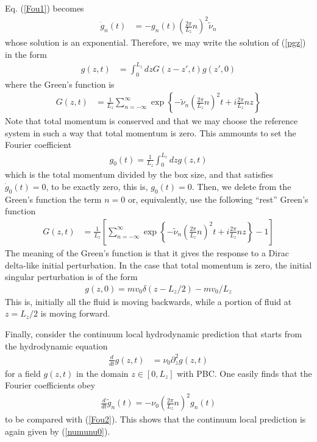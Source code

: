\documentclass[b5paper,openright,11pt]{book}
\begin{document}
\begin{appendices}
Eq. (\ref{Fou1}) becomes
\begin{align}
\dot{g}_n(t)
&=-  {g}_n(t)\left(\frac{2\pi}{L_z}n\right)^2\tilde{\nu}_n
\label{Fou2}
\end{align}
whose solution is an exponential. Therefore, we may write the solution
of (\ref{pgz}) in the form 
\begin{align}
  g(z,t)&=\int_0^{L_z} dz G(z-z',t)g(z',0)  
\end{align}
where the Green's function is 
\begin{align}
  G(z,t)&=\frac{1}{L_z}\sum_{n=-\infty}^\infty \exp\left\{-\tilde{\nu}_n\left(\frac{2\pi}{L_z}n\right)^2t+
i\frac{2\pi}{L_z}nz\right\}
\label{Green1}
\end{align}
Note  that total  momentum is  conserved and  that we  may choose  the
reference system in such a way that total momentum is zero. This ammounts to
set the Fourier coefficient
\begin{align}
  g_0(t)=\frac{1}{L_z}\int_0^{L_z}dz g(z,t)
\end{align}
which  is  the total  momentum  divided  by  the  box size,  and  that
satisfies   $\dot{g}_0(t)=0$,   to   be   exactly   zero,   this   is,
$g_0(t)=0$. Then, we delete from the Green's function the term
$n=0$ or, equivalently, use the following ``rest'' Green's function
\begin{align}
  G(z,t)&=\frac{1}{L_z}\left[\sum_{n=-\infty}^\infty \exp\left\{-\tilde{\nu}_n\left(\frac{2\pi}{L_z}n\right)^2t+
i\frac{2\pi}{L_z}nz\right\}-1\right]
\end{align}
The meaning of the Green's function is that it gives the response to a Dirac delta-like initial
perturbation. In the case that total momentum is zero, the initial singular perturbation is of the form
\begin{align}
  g(z,0)=mv_0 \delta(z-L_z/2)-mv_0/L_z
\end{align}
This is, initially all the fluid is moving backwards, while a portion of fluid at $z=L_z/2$ is moving
forward.

Finally, consider the continuum local hydrodynamic prediction that starts from the hydrodynamic equation
\begin{align}
  \frac{d}{dt} g(z,t) &= \nu_0 \partial_z^2 g(z,t)
\label{Diff1}
\end{align}
for a field $g(z,t)$ in the domain $z\in[0,L_z]$ with PBC.
One easily finds that the Fourier coefficients obey
\begin{align}
  \frac{d}{dt}\tilde{g}_n(t)=-\nu_0\left(\frac{2\pi}{L_z}n\right)^2 g_n(t)
\label{Fou0}
\end{align}
to be compared with (\ref{Fou2}). This shows that the continuum  local prediction is again
given by (\ref{numunu0}).


\end{appendices}
\end{document}
